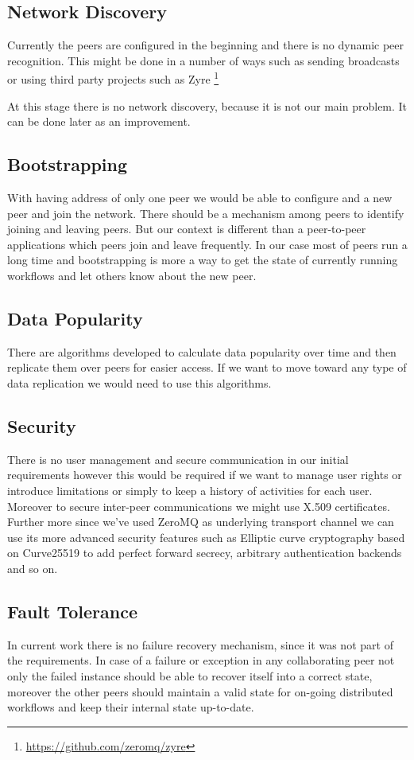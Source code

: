 \subsection{Network Discovery}
Currently the peers are configured in the beginning and there is no dynamic peer recognition. This might be done in a number of ways
such as sending broadcasts or using third party projects such as Zyre \footnote{\url{https://github.com/zeromq/zyre}}

At this stage there is no network discovery, because it is not our main problem. It can be done later as an improvement.

\subsection{Bootstrapping}
With having address of only one peer we would be able to configure and a new peer and join the network. There should be a mechanism among
peers to identify joining and leaving peers. But our context is different than a peer-to-peer applications which peers join and leave 
frequently. In our case most of peers run a long time and bootstrapping is more a way to get the state of currently running workflows and
let others know about the new peer.

\subsection{Data Popularity}
There are algorithms developed to calculate data popularity over time and then replicate them over peers for easier access. If we want to 
move toward any type of data replication we would need to use this algorithms.

\subsection{Security}
There is no user management and secure communication in our initial requirements however this would be required if we want to manage user
rights or introduce limitations or simply to keep a history of activities for each user. Moreover to secure inter-peer communications 
we might use X.509 certificates. Further more since we've used ZeroMQ as underlying transport channel we can use its more advanced
security features such as Elliptic curve cryptography\cite{Curve} based on Curve25519\cite{Curve25519} to add perfect forward secrecy, 
arbitrary authentication backends and so on.

\subsection{Fault Tolerance}
In current work there is no failure recovery mechanism, since it was not part of the requirements. In case of a failure or exception in any 
collaborating peer not only the failed instance should be able to recover itself into a correct state, moreover the other peers should maintain
a valid state for on-going distributed workflows and keep their internal state up-to-date.

